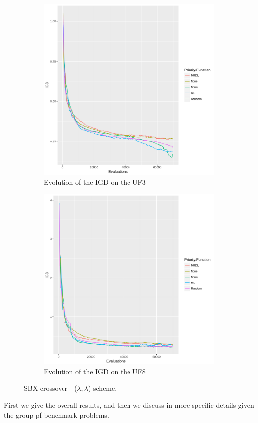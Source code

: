 \begin{figure}[!t]

		\begin{subfigure}[b]{0.49\textwidth}
			\centering
		\includegraphics[width=1\textwidth, height=0.7\textwidth]{images/UF3igd_all}
			\caption{Evolution of the IGD on the UF3}
		\end{subfigure}
		\begin{subfigure}[b]{0.49\textwidth}
			\centering
		\includegraphics[width=1\textwidth, height=0.7\textwidth]{images/UF8igd_all}
			\caption{Evolution of the IGD on the UF8}
		\end{subfigure}
		\caption{SBX crossover - ($\lambda, \lambda$) scheme.}
			\label{evolution_igd}
	\end{figure}


First we give the overall results, and then we discuss in more specific details given the group pf benchmark problems.
